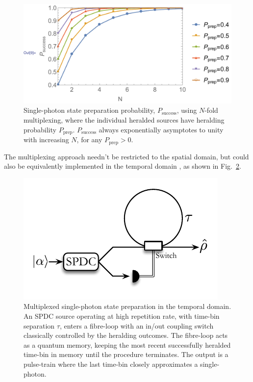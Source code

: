 \documentclass[aps,rmp,twocolumn,amsmath,amssymb,nofootinbib,superscriptaddress,longbibliography,floatfix,table-of-contents,eqsecnum]{revtex4-1}
\begin{document}
\begin{figure}[!htb]
\includegraphics[width=\columnwidth]{SPDC_multiplexing_plot}
\caption{Single-photon state preparation probability, $P_\text{success}$, using $N$-fold multiplexing, where the individual heralded sources have heralding probability $P_\text{prep}$. $P_\text{success}$ always exponentially asymptotes to unity with increasing $N$, for any \mbox{$P_\text{prep}>0$}.} \label{fig:SPDC_multiplexing_plot}
\end{figure}

The multiplexing approach needn't be restricted to the spatial domain, but could also be equivalently implemented in the temporal domain \cite{bib:RohdeLoopMulti15, mosley, othersSeePaper}, as shown in Fig.~\ref{fig:SPDC_time_multiplexing}.

\begin{figure}[!htb]
\includegraphics[width=0.75\columnwidth]{SPDC_time_multiplexing}
\caption{Multiplexed single-photon state preparation in the temporal domain. An SPDC source operating at high repetition rate, with time-bin separation $\tau$, enters a fibre-loop with an in/out coupling switch classically controlled by the heralding outcomes. The fibre-loop acts as a quantum memory, keeping the most recent successfully heralded time-bin in memory until the procedure terminates. The output is a pulse-train where the last time-bin closely approximates a single-photon.} \label{fig:SPDC_time_multiplexing}
\end{figure}
\end{document}
